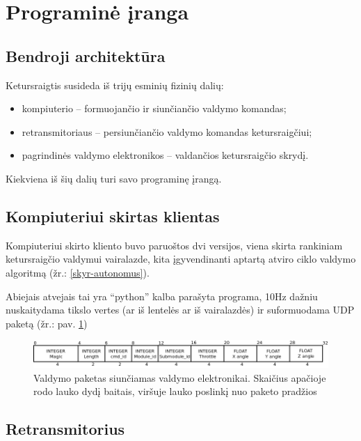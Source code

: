 \documentclass[12pt, a4paper, lithuanian, final]{article}
\begin{document}
\section{Programinė įranga}
\label{skyr-software}
\subsection{Bendroji architektūra}

Ketursraigtis susideda iš trijų esminių fizinių dalių:
\begin{itemize}
	\item kompiuterio -- formuojančio ir siunčiančio valdymo komandas;
	\item retransmitoriaus -- persiunčiančio valdymo komandas ketursraigčiui;
	\item pagrindinės valdymo elektronikos -- valdančios ketursraigčio skrydį.
\end{itemize}

Kiekviena iš šių dalių turi savo programinę įrangą.

\subsection{Kompiuteriui skirtas klientas}

Kompiuteriui skirto kliento buvo paruoštos dvi versijos, viena skirta rankiniam ketursraigčio valdymui vairalazde, kita įgyvendinanti aptartą atviro ciklo valdymo algoritmą (žr.: \ref{skyr-autonomus}).

Abiejais atvejais tai yra "`python"' kalba parašyta programa, 10Hz dažniu nuskaitydama tikslo vertes (ar iš lentelės ar iš vairalazdės) ir suformuodama UDP paketą (žr.: pav. \ref{pav-ctrl-packet})

\begin{figure}[H]
\begin{center}
\includegraphics[width=1.0\textwidth]{img/ctrl_packet.png}
\caption{Valdymo paketas siunčiamas valdymo elektronikai. Skaičius apačioje rodo lauko dydį baitais, viršuje lauko poslinkį nuo paketo pradžios}
\label{pav-ctrl-packet}
\end{center}
\end{figure}



\subsection{Retransmitorius}
\end{document}

